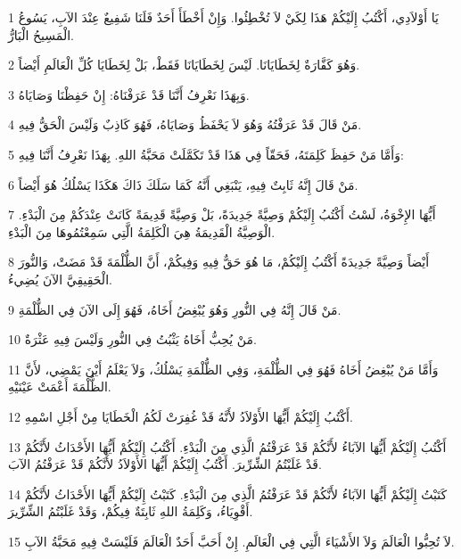 \par 1 يَا أَوْلاَدِي، أَكْتُبُ إِلَيْكُمْ هَذَا لِكَيْ لاَ تُخْطِئُوا. وَإِنْ أَخْطَأَ أَحَدٌ فَلَنَا شَفِيعٌ عِنْدَ الآبِ، يَسُوعُ الْمَسِيحُ الْبَارُّ.
\par 2 وَهُوَ كَفَّارَةٌ لِخَطَايَانَا. لَيْسَ لِخَطَايَانَا فَقَطْ، بَلْ لِخَطَايَا كُلِّ الْعَالَمِ أَيْضاً.
\par 3 وَبِهَذَا نَعْرِفُ أَنَّنَا قَدْ عَرَفْنَاهُ: إِنْ حَفِظْنَا وَصَايَاهُ.
\par 4 مَنْ قَالَ قَدْ عَرَفْتُهُ وَهُوَ لاَ يَحْفَظُ وَصَايَاهُ، فَهُوَ كَاذِبٌ وَلَيْسَ الْحَقُّ فِيهِ.
\par 5 وَأَمَّا مَنْ حَفِظَ كَلِمَتَهُ، فَحَقّاً فِي هَذَا قَدْ تَكَمَّلَتْ مَحَبَّةُ اللهِ. بِهَذَا نَعْرِفُ أَنَّنَا فِيهِ:
\par 6 مَنْ قَالَ إِنَّهُ ثَابِتٌ فِيهِ، يَنْبَغِي أَنَّهُ كَمَا سَلَكَ ذَاكَ هَكَذَا يَسْلُكُ هُوَ أَيْضاً.
\par 7 أَيُّهَا الإِخْوَةُ، لَسْتُ أَكْتُبُ إِلَيْكُمْ وَصِيَّةً جَدِيدَةً، بَلْ وَصِيَّةً قَدِيمَةً كَانَتْ عِنْدَكُمْ مِنَ الْبَدْءِ. الْوَصِيَّةُ الْقَدِيمَةُ هِيَ الْكَلِمَةُ الَّتِي سَمِعْتُمُوهَا مِنَ الْبَدْءِ.
\par 8 أَيْضاً وَصِيَّةً جَدِيدَةً أَكْتُبُ إِلَيْكُمْ، مَا هُوَ حَقٌّ فِيهِ وَفِيكُمْ، أَنَّ الظُّلْمَةَ قَدْ مَضَتْ، وَالنُّورَ الْحَقِيقِيَّ الآنَ يُضِيءُ.
\par 9 مَنْ قَالَ إِنَّهُ فِي النُّورِ وَهُوَ يُبْغِضُ أَخَاهُ، فَهُوَ إِلَى الآنَ فِي الظُّلْمَةِ.
\par 10 مَنْ يُحِبُّ أَخَاهُ يَثْبُتُ فِي النُّورِ وَلَيْسَ فِيهِ عَثْرَةٌ.
\par 11 وَأَمَّا مَنْ يُبْغِضُ أَخَاهُ فَهُوَ فِي الظُّلْمَةِ، وَفِي الظُّلْمَةِ يَسْلُكُ، وَلاَ يَعْلَمُ أَيْنَ يَمْضِي، لأَنَّ الظُّلْمَةَ أَعْمَتْ عَيْنَيْهِ.
\par 12 أَكْتُبُ إِلَيْكُمْ أَيُّهَا الأَوْلاَدُ لأَنَّهُ قَدْ غُفِرَتْ لَكُمُ الْخَطَايَا مِنْ أَجْلِ اسْمِهِ.
\par 13 أَكْتُبُ إِلَيْكُمْ أَيُّهَا الآبَاءُ لأَنَّكُمْ قَدْ عَرَفْتُمُ الَّذِي مِنَ الْبَدْءِ. أَكْتُبُ إِلَيْكُمْ أَيُّهَا الأَحْدَاثُ لأَنَّكُمْ قَدْ غَلَبْتُمُ الشِّرِّيرَ. أَكْتُبُ إِلَيْكُمْ أَيُّهَا الأَوْلاَدُ لأَنَّكُمْ قَدْ عَرَفْتُمُ الآبَ.
\par 14 كَتَبْتُ إِلَيْكُمْ أَيُّهَا الآبَاءُ لأَنَّكُمْ قَدْ عَرَفْتُمُ الَّذِي مِنَ الْبَدْءِ. كَتَبْتُ إِلَيْكُمْ أَيُّهَا الأَحْدَاثُ لأَنَّكُمْ أَقْوِيَاءُ، وَكَلِمَةُ اللهِ ثَابِتَةٌ فِيكُمْ، وَقَدْ غَلَبْتُمُ الشِّرِّيرَ.
\par 15 لاَ تُحِبُّوا الْعَالَمَ وَلاَ الأَشْيَاءَ الَّتِي فِي الْعَالَمِ. إِنْ أَحَبَّ أَحَدٌ الْعَالَمَ فَلَيْسَتْ فِيهِ مَحَبَّةُ الآبِ.
